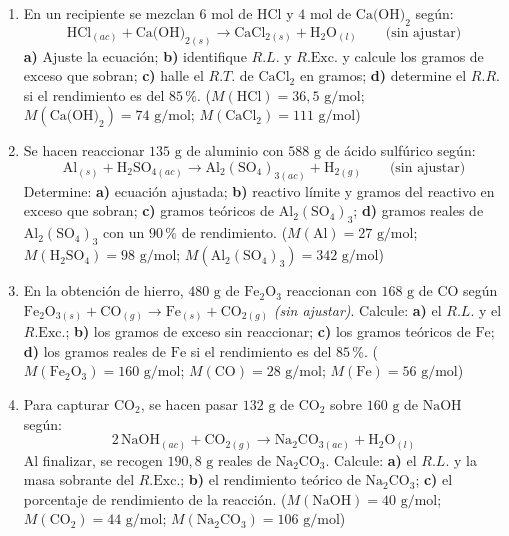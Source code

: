 \documentclass[12pt, letterpaper]{article}
\newcommand{\pc}{\text{\%}}
\begin{document}
\begin{enumerate}[leftmargin=*, start=45]

  \item \muyDificil{}\hspace{0.55em}En un recipiente se mezclan $6\text{ mol}$ de $\text{HCl}$ y $4\text{ mol}$ de $\text{Ca(OH)}_2$ según:
        \[
          \text{HCl}_{(ac)} + \text{Ca(OH)}_{2(s)} \longrightarrow \text{CaCl}_{2(s)} + \text{H}_2\text{O}_{(l)} \qquad \text{(sin ajustar)}
        \]
        \textbf{a)} Ajuste la ecuación; \textbf{b)} identifique $R.L.$ y $R.\text{Exc.}$ y calcule los gramos de exceso que sobran; \textbf{c)} halle el $R.T.$ de $\text{CaCl}_2$ en gramos; \textbf{d)} determine el $R.R.$ si el rendimiento es del $85\,\pc$. ($M(\text{HCl}) = 36{,}5\text{ g/mol}$; $M(\text{Ca(OH)}_2) = 74\text{ g/mol}$; $M(\text{CaCl}_2) = 111\text{ g/mol}$)

  \item \muyDificil{}\hspace{0.55em}Se hacen reaccionar $135\text{ g}$ de aluminio con $588\text{ g}$ de ácido sulfúrico según:
        \[
          \text{Al}_{(s)} + \text{H}_2\text{SO}_{4(ac)} \longrightarrow \text{Al}_2(\text{SO}_4)_{3(ac)} + \text{H}_{2(g)} \qquad \text{(sin ajustar)}
        \]
        Determine: \textbf{a)} ecuación ajustada; \textbf{b)} reactivo límite y gramos del reactivo en exceso que sobran; \textbf{c)} gramos teóricos de $\text{Al}_2(\text{SO}_4)_3$; \textbf{d)} gramos reales de $\text{Al}_2(\text{SO}_4)_3$ con un $90\,\pc$ de rendimiento. ($M(\text{Al}) = 27\text{ g/mol}$; $M(\text{H}_2\text{SO}_4) = 98\text{ g/mol}$; $M(\text{Al}_2(\text{SO}_4)_3) = 342\text{ g/mol}$)

  \item \muyDificil{}\hspace{0.55em}En la obtención de hierro, $480\text{ g}$ de $\text{Fe}_2\text{O}_3$ reaccionan con $168\text{ g}$ de $\text{CO}$ según $\text{Fe}_2\text{O}_{3(s)} + \text{CO}_{(g)} \longrightarrow \text{Fe}_{(s)} + \text{CO}_{2(g)}$ \emph{(sin ajustar)}. Calcule: \textbf{a)} el $R.L.$ y el $R.\text{Exc.}$; \textbf{b)} los gramos de exceso sin reaccionar; \textbf{c)} los gramos teóricos de $\text{Fe}$; \textbf{d)} los gramos reales de $\text{Fe}$ si el rendimiento es del $85\,\pc$. ($M(\text{Fe}_2\text{O}_3) = 160\text{ g/mol}$; $M(\text{CO}) = 28\text{ g/mol}$; $M(\text{Fe}) = 56\text{ g/mol}$)

  \item \muyDificil{}\hspace{0.55em}Para capturar $\text{CO}_2$, se hacen pasar $132\text{ g}$ de $\text{CO}_2$ sobre $160\text{ g}$ de $\text{NaOH}$ según:
        \[
          2\,\text{NaOH}_{(ac)} + \text{CO}_{2(g)} \longrightarrow \text{Na}_2\text{CO}_{3(ac)} + \text{H}_2\text{O}_{(l)}
        \]
        Al finalizar, se recogen $190{,}8\text{ g}$ reales de $\text{Na}_2\text{CO}_3$. Calcule: \textbf{a)} el $R.L.$ y la masa sobrante del $R.\text{Exc.}$; \textbf{b)} el rendimiento teórico de $\text{Na}_2\text{CO}_3$; \textbf{c)} el porcentaje de rendimiento de la reacción. ($M(\text{NaOH}) = 40\text{ g/mol}$; $M(\text{CO}_2) = 44\text{ g/mol}$; $M(\text{Na}_2\text{CO}_3) = 106\text{ g/mol}$)


\end{enumerate}
\end{document}
